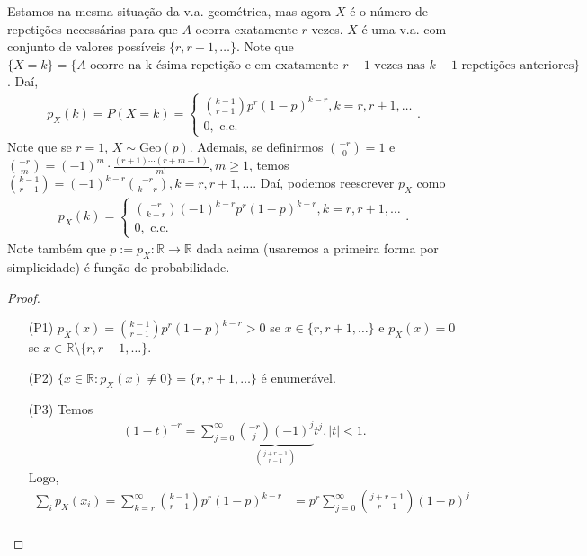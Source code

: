 \documentclass[../Notas.tex]{subfiles}
\begin{document}
\begin{example}
Estamos na mesma situação da v.a. geométrica, mas agora $X$ é o número de repetições necessárias para que $A$ ocorra exatamente $r$ vezes. $X$ é uma v.a. com conjunto de valores possíveis $\{ r, r+1, \dots \}$. Note que $\{ X=k \} = \{ A \text{ ocorre na k-ésima repetição e em exatamente } r-1 \text{ vezes nas } k-1 \text{ repetições anteriores} \}$. Daí,
\begin{align*}
    p_X(k) = P(X=k) =\begin{cases}
    \binom{k-1}{r-1}p^r(1-p)^{k-r}, k = r, r+1, \dots \\
    0, \text{ c.c.}
    \end{cases}.
\end{align*}
Note que se $r=1$, $X\sim\text{Geo}(p)$. Ademais, se definirmos $\displaystyle{ \binom{-r}{0} = 1 }$ e $\displaystyle{ \binom{-r}{m} = (-1)^m\cdot\frac{(r+1)\cdots (r+m-1)}{m!}, m\geq 1 }$, temos $\displaystyle{ \binom{k-1}{r-1} = (-1)^{k-r}\binom{-r}{k-r}, k = r, r+1, \dots }$. Daí, podemos reescrever $p_X$ como
\begin{align*}
    p_X(k) = \begin{cases}
    \binom{-r}{k-r}(-1)^{k-r}p^r(1-p)^{k-r}, k = r, r+1, \dots \\
    0, \text{ c.c.}
    \end{cases}.
\end{align*}
Note também que $p:=p_X:\mathbb{R}\to\mathbb{R}$ dada acima (usaremos a primeira forma por simplicidade) é função de probabilidade.
\begin{proof}
\begin{itemize}
    \item[(P1)] $p_X(x) = \displaystyle{ \binom{k-1}{r-1}p^r(1-p)^{k-r} > 0 }$ se $x\in\{r, r+1, \dots\}$ e $p_X(x) = 0$ se $x\in\mathbb{R}\setminus\{r, r+1, \dots\}$.
    \item[(P2)] $\{ x\in\mathbb{R} : p_X(x) \neq 0 \} = \{r, r+1, \dots\}$ é enumerável.
    \item[(P3)] Temos
    \begin{align*}
        (1-t)^{-r} = \sum_{j=0}^{\infty}\underbrace{\binom{-r}{j}(-1)^j}_{\binom{j+r-1}{r-1}}t^j, |t| < 1.
    \end{align*}
    Logo, 
    \begin{align*}
        \sum_i p_X(x_i) = \sum_{k=r}^{\infty}\binom{k-1}{r-1}p^r(1-p)^{k-r} &= p^r\sum_{j=0}^{\infty}\binom{j+r-1}{r-1}(1-p)^j \\

\end{align*}
\end{itemize}
\end{proof}
\end{example}
\end{document}
